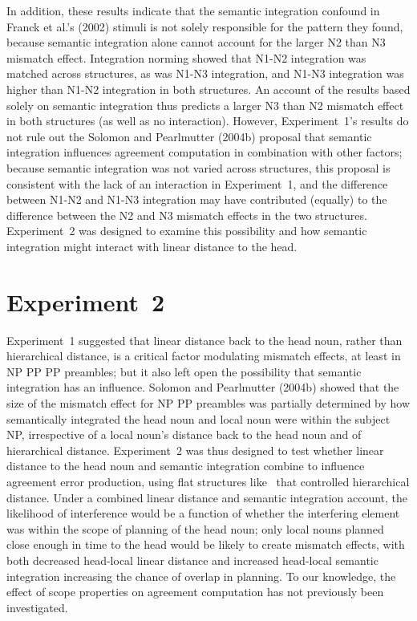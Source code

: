 \documentclass[12pt,titlepage]{article}
\begin{document}
In addition, these results indicate that the semantic integration confound
in Franck et al.'s (2002) stimuli is not solely responsible for the pattern
they found, because semantic integration alone cannot account for the
larger N2 than N3 mismatch effect.  Integration norming showed that N1-N2
integration was matched across structures, as was N1-N3 integration, and
N1-N3 integration was higher than N1-N2 integration in both structures.  An
account of the results based solely on semantic integration thus predicts a
larger N3 than N2 mismatch effect in both structures (as well as no
interaction).  However, Experiment~1's results do not rule out the Solomon
and Pearlmutter (2004b) proposal that semantic integration influences
agreement computation in combination with other factors; because semantic
integration was not varied across structures, this proposal is consistent
with the lack of an interaction in Experiment~1, and the difference between
N1-N2 and N1-N3 integration may have contributed (equally) to the
difference between the N2 and N3 mismatch effects in the two structures.
Experiment~2 was designed to examine this possibility and how semantic
integration might interact with linear distance to the head.

\section[Experiment~2]{\center Experiment~2}

Experiment~1 suggested that linear distance back to the head noun, rather
than hierarchical distance, is a critical factor modulating mismatch
effects, at least in NP PP PP preambles; but it also left open the
possibility that semantic integration has an influence.  Solomon and
Pearlmutter (2004b) showed that the size of the mismatch effect for NP PP
preambles was partially determined by how semantically integrated the head
noun and local noun were within the subject NP, irrespective of a local
noun's distance back to the head noun and of hierarchical distance.
Experiment~2 was thus designed to test whether linear distance to the head
noun and semantic integration combine to influence agreement error
production, using flat structures like~ that controlled
hierarchical distance.  Under a combined linear distance and semantic
integration account, the likelihood of interference would be a function of
whether the interfering element was within the scope of planning of the
head noun; only local nouns planned close enough in time to the head would
be likely to create mismatch effects, with both decreased head-local linear
distance and increased head-local semantic integration increasing the
chance of overlap in planning.  To our knowledge, the effect of scope
properties on agreement computation has not previously been investigated.
\end{document}
